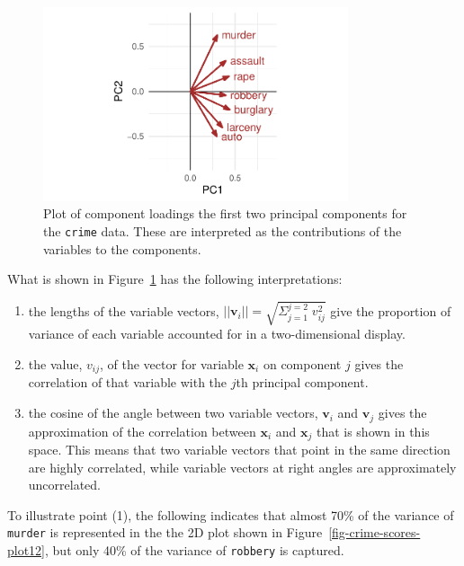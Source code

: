 \documentclass[
  letterpaper,
  10pt,
  krantz2]{krantz}
\begin{document}
\begin{figure}[H]

{\centering \includegraphics[width=0.8\textwidth,height=\textheight]{figs/ch04/fig-crime-vectors-1.pdf}

}

\caption{\label{fig-crime-vectors}Plot of component loadings the first
two principal components for the \texttt{crime} data. These are
interpreted as the contributions of the variables to the components.}

\end{figure}

What is shown in Figure~\ref{fig-crime-vectors} has the following
interpretations:

\begin{enumerate}
\def\labelenumi{(\arabic{enumi})}
\item
  the lengths of the variable vectors,
  \(||\mathbf{v}_i|| = \sqrt{\Sigma_{j = 1}^{j=2} \; v_{ij}^2}\) give
  the proportion of variance of each variable accounted for in a
  two-dimensional display.
\item
  the value, \(v_{ij}\), of the vector for variable \(\mathbf{x}_i\) on
  component \(j\) gives the correlation of that variable with the
  \(j\)th principal component.
\item
  the cosine of the angle between two variable vectors, \(\mathbf{v}_i\)
  and \(\mathbf{v}_j\) gives the approximation of the correlation
  between \(\mathbf{x}_i\) and \(\mathbf{x}_j\) that is shown in this
  space. This means that two variable vectors that point in the same
  direction are highly correlated, while variable vectors at right
  angles are approximately uncorrelated.
\end{enumerate}

To illustrate point (1), the following indicates that almost 70\% of the
variance of \texttt{murder} is represented in the the 2D plot shown in
Figure~\ref{fig-crime-scores-plot12}, but only 40\% of the variance of
\texttt{robbery} is captured.
\end{document}
